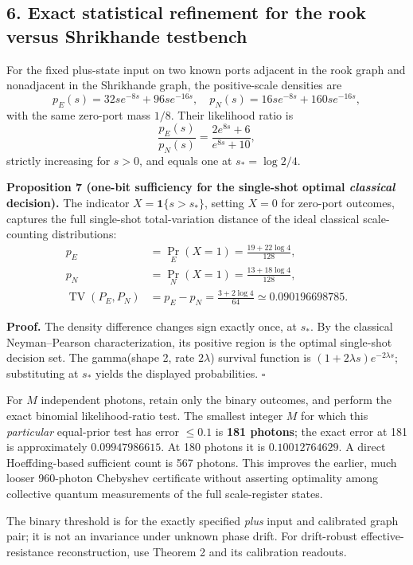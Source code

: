 \documentclass[
  10pt,
  a4paper,
]{article}
\begin{document}
\subsection{6. Exact statistical refinement for the rook versus Shrikhande testbench}\label{exact-statistical-refinement-for-the-rook-versus-shrikhande-testbench}

For the fixed plus-state input on two known ports adjacent in the rook graph and nonadjacent in the Shrikhande graph, the positive-scale densities are \[
p_E(s)=32s e^{-8s}+96s e^{-16s},\quad
p_N(s)=16s e^{-8s}+160s e^{-16s},
\] with the same zero-port mass \(1/8\). Their likelihood ratio is \[
\frac{p_E(s)}{p_N(s)}=\frac{2e^{8s}+6}{e^{8s}+10},
\] strictly increasing for \(s>0\), and equals one at \(s_*=\log2/4\).

\textbf{Proposition 7 (one-bit sufficiency for the single-shot optimal \emph{classical} decision).} The indicator \(X=\mathbf1\{s>s_*\}\), setting \(X=0\) for zero-port outcomes, captures the full single-shot total-variation distance of the ideal classical scale-counting distributions: \[
\begin{aligned}
p_E&=\Pr_E(X=1)=\frac{19+22\log4}{128},\\
p_N&=\Pr_N(X=1)=\frac{13+18\log4}{128},\\
\operatorname{TV}(P_E,P_N)&=p_E-p_N=\frac{3+2\log4}{64}\simeq0.090196698785.
\end{aligned}
\]

\textbf{Proof.} The density difference changes sign exactly once, at \(s_*\). By the classical Neyman--Pearson characterization, its positive region is the optimal single-shot decision set. The gamma(shape 2, rate \(2\lambda\)) survival function is \((1+2\lambda s)e^{-2\lambda s}\); substituting at \(s_*\) yields the displayed probabilities. \(\square\)

For \(M\) independent photons, retain only the binary outcomes, and perform the exact binomial likelihood-ratio test. The smallest integer \(M\) for which this \emph{particular} equal-prior test has error \(\leq0.1\) is \textbf{181 photons}; the exact error at 181 is approximately \(0.09947986615\). At 180 photons it is \(0.10012764629\). A direct Hoeffding-based sufficient count is 567 photons. This improves the earlier, much looser 960-photon Chebyshev certificate without asserting optimality among collective quantum measurements of the full scale-register states.

The binary threshold is for the exactly specified \emph{plus} input and calibrated graph pair; it is not an invariance under unknown phase drift. For drift-robust effective-resistance reconstruction, use Theorem 2 and its calibration readouts.
\end{document}
